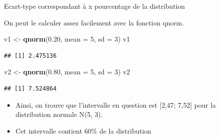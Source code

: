 \documentclass[ignorenonframetext,]{beamer}
\newenvironment{Shaded}{\begin{snugshade}}{\end{snugshade}}
\newcommand{\KeywordTok}[1]{\textcolor[rgb]{0.13,0.29,0.53}{\textbf{#1}}}
\newcommand{\DataTypeTok}[1]{\textcolor[rgb]{0.13,0.29,0.53}{#1}}
\newcommand{\DecValTok}[1]{\textcolor[rgb]{0.00,0.00,0.81}{#1}}
\newcommand{\FloatTok}[1]{\textcolor[rgb]{0.00,0.00,0.81}{#1}}
\newcommand{\StringTok}[1]{\textcolor[rgb]{0.31,0.60,0.02}{#1}}
\newcommand{\NormalTok}[1]{#1}
\providecommand{\tightlist}{%
  \setlength{\itemsep}{0pt}\setlength{\parskip}{0pt}}
\begin{document}
\begin{frame}[fragile]{Ecart-type correspondant à x pourcentage de la
distribution}

On peut le calculer assez facilement avec la fonction qnorm.

\begin{Shaded}
\begin{Highlighting}[]
\NormalTok{v1 <-}\StringTok{ }\KeywordTok{qnorm}\NormalTok{(}\FloatTok{0.20}\NormalTok{, }\DataTypeTok{mean =} \DecValTok{5}\NormalTok{, }\DataTypeTok{sd =} \DecValTok{3}\NormalTok{)}
\NormalTok{v1}
\end{Highlighting}
\end{Shaded}

\begin{verbatim}
## [1] 2.475136
\end{verbatim}

\begin{Shaded}
\begin{Highlighting}[]
\NormalTok{v2 <-}\StringTok{ }\KeywordTok{qnorm}\NormalTok{(}\FloatTok{0.80}\NormalTok{, }\DataTypeTok{mean =} \DecValTok{5}\NormalTok{, }\DataTypeTok{sd =} \DecValTok{3}\NormalTok{)}
\NormalTok{v2}
\end{Highlighting}
\end{Shaded}

\begin{verbatim}
## [1] 7.524864
\end{verbatim}

\begin{itemize}[<+->]
\tightlist
\item
  Ainsi, on trouve que l'intervalle en question est {[}2,47; 7,52{]}
  pour la distribution normale N(5, 3).
\end{itemize}

\begin{itemize}[<+->]
\tightlist
\item
  Cet intervalle contient 60\% de la distribution
\end{itemize}

\end{frame}
\end{document}
